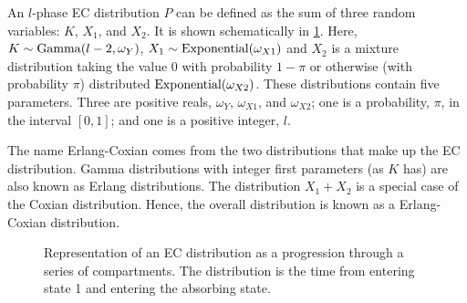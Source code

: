 \documentclass[thesis.tex]{subfiles}
\begin{document}
An $l$-phase EC distribution $P$ can be defined as the sum of three random variables: $K$, $X_1$, and $X_2$.
It is shown schematically in \cref{SEIR:fig:EC}.
Here, $K \sim \operatorname{Gamma}(l-2, \omega_Y)$, $X_1 \sim \operatorname{Exponential}(\omega_{X1})$ and $X_2$ is a mixture distribution taking the value 0 with probability $1-\pi$ or otherwise (\ie with probability $\pi$) distributed $\operatorname{Exponential}(\omega_{X2})$.
These distributions contain five parameters.
Three are positive reals, $\omega_Y$, $\omega_{X1}$, and $\omega_{X2}$; one is a probability, $\pi$, in the interval $[0, 1]$; and one is a positive integer, $l$.

The name Erlang-Coxian comes from the two distributions that make up the EC distribution.
Gamma distributions with integer first parameters (as $K$ has) are also known as Erlang distributions.
The distribution $X_1 + X_2$ is a special case of the Coxian distribution.
Hence, the overall distribution is known as a Erlang-Coxian distribution.

\begin{figure}
\caption[A $l$ phase EC distribution.]{Representation of an EC distribution as a progression through a series of compartments. The distribution is the time from entering state 1 and entering the absorbing state.}
\label{SEIR:fig:EC}
\end{figure}
\end{document}
